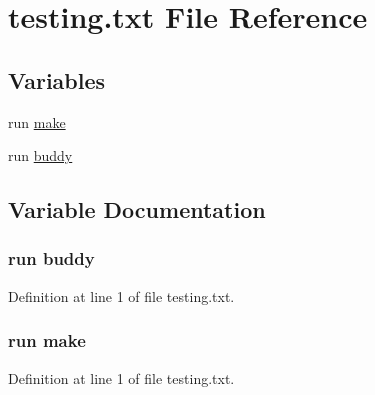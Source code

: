 \hypertarget{testing_8txt}{}\section{testing.\+txt File Reference}
\label{testing_8txt}
\subsection*{Variables}
\begin{DoxyCompactItemize}
\item 
run \hyperlink{testing_8txt_ab64b9a3bfa1737ec2f5ba1ec99acd2cb}{make}
\item 
run \hyperlink{testing_8txt_a1b09f46ec0371e8189fd2b2606700b26}{buddy}
\end{DoxyCompactItemize}


\subsection{Variable Documentation}
\subsubsection[{\texorpdfstring{buddy}{buddy}}]{\setlength{\rightskip}{0pt plus 5cm}run buddy}\hypertarget{testing_8txt_a1b09f46ec0371e8189fd2b2606700b26}{}\label{testing_8txt_a1b09f46ec0371e8189fd2b2606700b26}


Definition at line 1 of file testing.\+txt.

\subsubsection[{\texorpdfstring{make}{make}}]{\setlength{\rightskip}{0pt plus 5cm}run make}\hypertarget{testing_8txt_ab64b9a3bfa1737ec2f5ba1ec99acd2cb}{}\label{testing_8txt_ab64b9a3bfa1737ec2f5ba1ec99acd2cb}


Definition at line 1 of file testing.\+txt.

